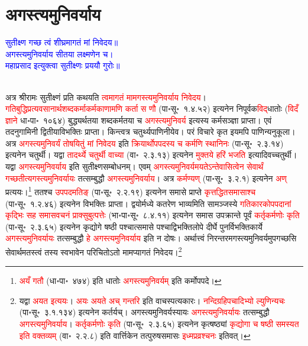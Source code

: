 \section[अगस्त्यमुनिवर्याय]{अगस्त्यमुनिवर्याय}
\centering\textcolor{blue}{सुतीक्ष्ण गच्छ त्वं शीघ्रमागतं मां निवेदय॥\\
अगस्त्यमुनिवर्याय सीतया लक्ष्मणेन च।\nopagebreak\\
महाप्रसाद इत्युक्त्वा सुतीक्ष्णः प्रययौ गुरोः॥}\nopagebreak\\
\\
\begin{sloppypar}\justifying\noindent\hspace{10mm} अत्र श्रीरामः सुतीक्ष्णं प्रति कथयति \textcolor{red}{त्वमागतं मामगस्त्य\-मुनि\-वर्याय निवेदय}। \textcolor{red}{गति\-बुद्धि\-प्रत्यवसानार्थ\-शब्द\-कर्माकर्मकाणामणि कर्ता स णौ} (पा॰सू॰~१.४.५२) इत्यनेन नि\-पूर्वक\-\textcolor{red}{विद्‌}\-धातोः (\textcolor{red}{विदँ ज्ञाने} धा॰पा॰~१०६४) बुद्ध्यर्थतया शब्द\-कर्मतया च \textcolor{red}{अगस्त्यमुनिवर्य} इत्यस्य कर्म\-सञ्ज्ञा प्राप्ता। एवं तदनुगामिनी द्वितीया\-विभक्तिः प्राप्ता। किन्त्वत्र चतुर्थ्यपाणिनीयेव। परं विचारे कृत इयमपि पाणिन्यनुकूला। अत्र \textcolor{red}{अगस्त्य\-मुनि\-वर्यं तोषयितुं मां निवेदय} इति \textcolor{red}{क्रियार्थोपपदस्य च कर्मणि स्थानिनः} (पा॰सू॰~२.३.१४) इत्यनेन चतुर्थी। यद्वा \textcolor{red}{तादर्थ्ये चतुर्थी वाच्या} (वा॰~२.३.१३) इत्यनेन \textcolor{red}{मुक्तये हरिं भजति} इत्यादिवच्चतुर्थी। यद्वा \textcolor{red}{अगस्त्य\-मुनि\-वर्याय} इति सुतीक्ष्ण\-सम्बोधनम्। एवम् \textcolor{red}{अगस्त्य\-मुनि\-वर्यमयतेऽन्तेवासित्वेन सेवार्थं गच्छतीत्यगस्त्य\-मुनि\-वर्यायः} तत्सम्बुद्धौ \textcolor{red}{अगस्त्य\-मुनि\-वर्याय}। अत्र \textcolor{red}{कर्मण्यण्‌} (पा॰सू॰~३.२.१) इत्यनेन \textcolor{red}{अण्‌} प्रत्ययः।\footnote{\textcolor{red}{अयँ गतौ} (धा॰पा॰~४७४) इति धातोः \textcolor{red}{अगस्त्य\-मुनि\-वर्यम्‌} इति कर्मोपपदे।} ततश्च \textcolor{red}{उपपदमतिङ्‌} (पा॰सू॰~२.२.१९) इत्यनेन समासे प्राप्ते \textcolor{red}{कृत्तद्धित\-समासाश्च} (पा॰सू॰~१.२.४६) इत्यनेन विभक्तिः प्राप्ता। द्वयोर्मध्ये कतरेण भाव्यमिति सामञ्जस्ये \textcolor{red}{गति\-कारकोपपदानां कृद्भिः सह समास\-वचनं प्राक्सुबुत्पत्तेः} (भा॰पा॰सू॰~८.४.११) इत्यनेन समास उपक्रान्ते पूर्वं \textcolor{red}{कर्तृ\-कर्मणोः कृति} (पा॰सू॰~२.३.६५) इत्यनेन कृद्योगे षष्ठी पश्चात्समासे पश्चाद्विभक्ति\-लोपे दीर्घे पुनर्विभक्ति\-कार्ये \textcolor{red}{अगस्त्य\-मुनि\-वर्यायः} तत्सम्बुद्धौ \textcolor{red}{हे अगस्त्य\-मुनि\-वर्याय} इति न दोषः। अर्थात्त्वं निरन्तरमगस्त्य\-मुनि\-वर्यमुपगच्छसि सेवार्थमतस्त्वं तस्य स्वभावेन परिचितोऽतो मामप्यागतं निवेदय।\footnote{यद्वा \textcolor{red}{अयत इत्ययः}। \textcolor{red}{अयः अयते अच् गन्तरि} इति वाचस्पत्यकारः। \textcolor{red}{नन्दि\-ग्रहि\-पचादिभ्यो ल्युणिन्यचः} (पा॰सू॰~३.१.१३४) इत्यनेन कर्तर्यच्। अगस्त्य\-मुनि\-वर्यस्यायः \textcolor{red}{अगस्त्यमुनिवर्यायः} तत्सम्बुद्धौ \textcolor{red}{अगस्त्य\-मुनि\-वर्याय}। \textcolor{red}{कर्तृकर्मणोः कृति} (पा॰सू॰~२.३.६५) इत्यनेन कृत्षष्ठ्यां \textcolor{red}{कृद्योगा च षष्ठी समस्यत इति वक्तव्यम्‌} (वा॰~२.२.८) इति वार्त्तिकेन तत्पुरुष\-समासः \textcolor{red}{इध्मप्रव्रश्चनः} इतिवत्।}\end{sloppypar}
